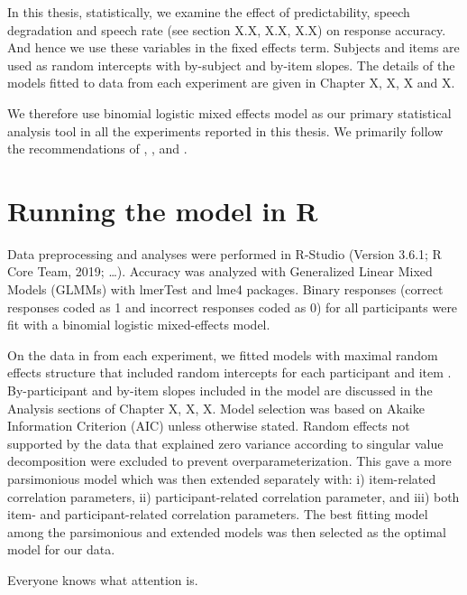 \documentclass[a4paper, nobind]{templates/ociamthesis}
\begin{document}
In this thesis, statistically, we examine the effect of predictability, speech degradation and speech rate (see section X.X, X.X, X.X) on response accuracy.
And hence we use these variables in the fixed effects term.
Subjects and items are used as random intercepts with by-subject and by-item slopes.
The details of the models fitted to data from each experiment are given in Chapter X, X, X and X.

We therefore use binomial logistic mixed effects model as our primary statistical analysis tool in all the experiments reported in this thesis. We primarily follow the recommendations of \textcite{Baayen2008}, \textcite{Barr2013}, and \textcite{Bates2015a}.

\hypertarget{analysis-main}{%
\section{Running the model in R}\label{analysis-main}}

Data preprocessing and analyses were performed in R-Studio (Version 3.6.1; R Core Team, 2019; \ldots).
Accuracy was analyzed with Generalized Linear Mixed Models (GLMMs) with lmerTest \autocite{Kuznetsova2017} and lme4 \autocite{Bates2015} packages.
Binary responses (correct responses coded as 1 and incorrect responses coded as 0) for all participants were fit with a binomial logistic mixed-effects model.

On the data in from each experiment, we fitted models with maximal random effects structure that included random intercepts for each participant and item \autocite{Barr2013}.
By-participant and by-item slopes included in the model are discussed in the Analysis sections of Chapter X, X, X.
Model selection was based on Akaike Information Criterion (AIC) \autocite{Grueber2011,Richards2011} unless otherwise stated.
Random effects not supported by the data that explained zero variance according to singular value decomposition were excluded to prevent overparameterization.
This gave a more parsimonious model \autocite{Bates2015a} which was then extended separately with: i) item-related correlation parameters, ii) participant-related correlation parameter, and iii) both item- and participant-related correlation parameters.
The best fitting model among the parsimonious and extended models was then selected as the optimal model for our data.

\begin{savequote}
Everyone knows what attention is.
\end{savequote}
\end{document}
